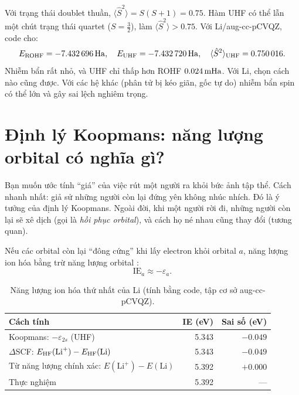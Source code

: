 \begin{congthuc}
Với trạng thái doublet thuần, $\langle\hat S^2\rangle=S(S+1)=0.75$. Hàm UHF có thể lẫn một chút trạng thái quartet ($S=\tfrac32$), làm $\langle\hat S^2\rangle>0.75$. Với Li/aug-cc-pCVQZ, code cho:
\[
E_{\rm ROHF}=-7.432\,696\,\mathrm{Ha},\quad E_{\rm UHF}=-7.432\,720\,\mathrm{Ha},\quad \langle\hat S^2\rangle_{\rm UHF}=0.750\,016 .
\]
Nhiễm bẩn rất nhỏ, và UHF chỉ thấp hơn ROHF $0.024\,\mathrm{mHa}$. Với Li, chọn cách nào cũng được. Với các hệ khác (phân tử bị kéo giãn, gốc tự do) nhiễm bẩn spin có thể lớn và gây sai lệch nghiêm trọng.
\end{congthuc}

\section{Định lý Koopmans: năng lượng orbital có nghĩa gì?}

\begin{eli5}
Bạn muốn ước tính ``giá'' của việc rút một người ra khỏi bức ảnh tập thể. Cách nhanh nhất: giả sử những người còn lại đứng yên không nhúc nhích. Đó là ý tưởng của định lý Koopmans. Ngoài đời, khi một người rời đi, những người còn lại sẽ xê dịch (gọi là \emph{hồi phục orbital}), và cách họ né nhau cũng thay đổi (tương quan).
\end{eli5}

\begin{congthuc}
Nếu các orbital còn lại ``đông cứng'' khi lấy electron khỏi orbital $a$, năng lượng ion hóa bằng trừ năng lượng orbital \cite{Koopmans1934}:
\[
\text{IE}_a\approx-\varepsilon_a .
\]
\end{congthuc}

\begin{table}[h]
\centering\small
\caption{Năng lượng ion hóa thứ nhất của Li (tính bằng code, tập cơ sở aug-cc-pCVQZ).}
\label{tab:koopmans}
\begin{tabular}{@{}lrr@{}}
\toprule
Cách tính & IE (eV) & Sai số (eV) \\
\midrule
Koopmans: $-\varepsilon_{2s}$ (UHF) & 5.343 & $-0.049$ \\
$\Delta$SCF: $E_{\rm HF}(\text{Li}^+)-E_{\rm HF}(\text{Li})$ & 5.343 & $-0.049$ \\
Từ năng lượng chính xác: $E(\text{Li}^+)-E(\text{Li})$ & 5.392 & $+0.000$ \\
Thực nghiệm \cite{NIST-ASD} & 5.392 & --- \\
\bottomrule
\end{tabular}
\end{table}

